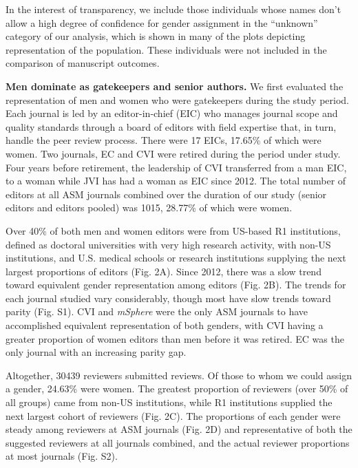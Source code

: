 \documentclass[11pt,]{article}
\begin{document}
In the interest of transparency, we include those individuals whose
names don't allow a high degree of confidence for gender assignment in
the ``unknown'' category of our analysis, which is shown in many of the
plots depicting representation of the population. These individuals were
not included in the comparison of manuscript outcomes.

\textbf{Men dominate as gatekeepers and senior authors.} We first
evaluated the representation of men and women who were gatekeepers
during the study period. Each journal is led by an editor-in-chief (EIC)
who manages journal scope and quality standards through a board of
editors with field expertise that, in turn, handle the peer review
process. There were 17 EICs, 17.65\% of which were women. Two journals,
EC and CVI were retired during the period under study. Four years before
retirement, the leadership of CVI transferred from a man EIC, to a woman
while JVI has had a woman as EIC since 2012. The total number of editors
at all ASM journals combined over the duration of our study (senior
editors and editors pooled) was 1015, 28.77\% of which were women.

Over 40\% of both men and women editors were from US-based R1
institutions, defined as doctoral universities with very high research
activity, with non-US institutions, and U.S. medical schools or research
institutions supplying the next largest proportions of editors (Fig.
2A). Since 2012, there was a slow trend toward equivalent gender
representation among editors (Fig. 2B). The trends for each journal
studied vary considerably, though most have slow trends toward parity
(Fig. S1). CVI and \emph{mSphere} were the only ASM journals to have
accomplished equivalent representation of both genders, with CVI having
a greater proportion of women editors than men before it was retired. EC
was the only journal with an increasing parity gap.

Altogether, 30439 reviewers submitted reviews. Of those to whom we could
assign a gender, 24.63\% were women. The greatest proportion of
reviewers (over 50\% of all groups) came from non-US institutions, while
R1 institutions supplied the next largest cohort of reviewers (Fig. 2C).
The proportions of each gender were steady among reviewers at ASM
journals (Fig. 2D) and representative of both the suggested reviewers at
all journals combined, and the actual reviewer proportions at most
journals (Fig. S2).
\end{document}

